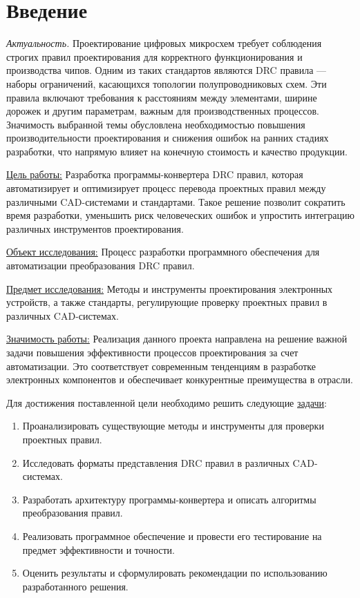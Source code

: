 \chapter*{Введение}

\textit{Актуальность.}
Проектирование цифровых микросхем требует соблюдения строгих правил
проектирования для корректного функционирования и производства чипов.
Одним из таких стандартов являются DRC правила --- наборы ограничений,
касающихся топологии полупроводниковых схем.
Эти правила включают требования к расстояниям между элементами,
ширине дорожек и другим параметрам, важным для производственных процессов.
Значимость выбранной темы обусловлена необходимостью повышения
производительности проектирования
и снижения ошибок на ранних стадиях разработки,
что напрямую влияет на конечную стоимость и качество продукции.

\underline{Цель работы:}
Разработка программы-конвертера DRC правил, которая автоматизирует
и оптимизирует процесс перевода проектных правил между различными
CAD-системами и стандартами.
Такое решение позволит сократить время разработки,
уменьшить риск человеческих ошибок
и упростить интеграцию различных инструментов проектирования.

\underline{Объект исследования:}
Процесс разработки программного обеспечения
для автоматизации преобразования DRC правил.

\underline{Предмет исследования:}
Методы и инструменты проектирования электронных устройств,
а также стандарты, регулирующие проверку проектных правил
в различных CAD-системах.

\underline{Значимость работы:}
Реализация данного проекта направлена на решение важной
задачи повышения эффективности процессов проектирования за счет автоматизации.
Это соответствует современным тенденциям в разработке электронных компонентов
и обеспечивает конкурентные преимущества в отрасли.

Для достижения поставленной цели
необходимо решить следующие \underline{задачи}:

\begin{enumerate}
	\item Проанализировать существующие методы
		и инструменты для проверки проектных правил.
	\item Исследовать форматы представления DRC правил
		в различных CAD-системах.
	\item Разработать архитектуру программы-конвертера
		и описать алгоритмы преобразования правил.
	\item Реализовать программное обеспечение
		и провести его тестирование на предмет эффективности и точности.
	\item Оценить результаты и сформулировать рекомендации
		по использованию разработанного решения.
\end{enumerate}

